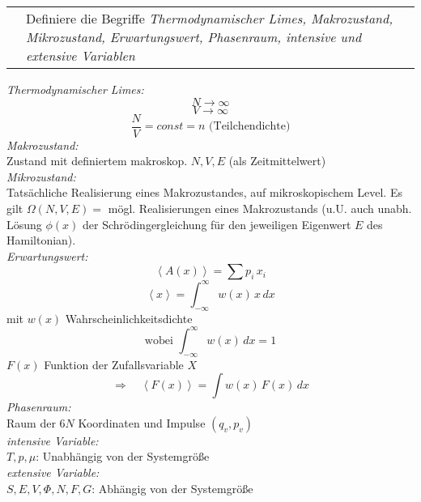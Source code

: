 \documentclass[a4paper,12pt]{scrartcl}
\makeatletter
\def\rsp{\right>}					%
\def\lsp{\left<}					%
\newcounter{qc}\setcounter{qc}{1}
\newenvironment{fshaded}{
\def\FrameCommand{\fcolorbox{framecolor}{shadecolor}}
\MakeFramed {\FrameRestore}}
{\endMakeFramed}
\def\frage#1{
\begin{fshaded}
\noindent
\begin{tabularx}{0.99\textwidth}{@{}c!{\color{framecolor}\vline}X}
{ \bf \rm \theqc }	&	\noindent #1
\end{tabularx}
\stepcounter{qc}
\end{fshaded}
}
\makeatother
\begin{document}
\frage{Definiere die Begriffe \textit{Thermodynamischer Limes, Makrozustand, Mikrozustand, Erwartungswert, Phasenraum, 
intensive und extensive Variablen}}
\noindent
\textit{Thermodynamischer Limes:}\\
\[N \rightarrow \infty\]
\[V \rightarrow \infty\]
\[\frac{N}{V}=const=n \mbox{ (Teilchendichte)}\]
\textit{Makrozustand:}\\Zustand mit definiertem makroskop. $N,V,E$ (als Zeitmittelwert)\\
\textit{Mikrozustand:}\\Tatsächliche Realisierung eines Makrozustandes, auf mikroskopischem Level. Es gilt $\Omega(N,V,E)=$ 
mögl. Realisierungen eines Makrozustands (u.U. auch unabh. Lösung $\phi(x)$ der Schrödingergleichung für den jeweiligen 
Eigenwert $E$ des Hamiltonian).\\
\textit{Erwartungswert:}
\[\lsp{A(x)}\rsp=\sum p_i\,x_i\]
\[\lsp{x}\rsp=\int_{-\infty}^{\infty} w(x)\,x\,dx\]
mit $w(x)$ Wahrscheinlichkeitsdichte
\[\mbox{wobei } \int_{-\infty}^{\infty}w(x)\,dx=1\]
$F(x)$ Funktion der Zufallsvariable $X$
\[\Rightarrow \quad\lsp{F(x)}\rsp=\int w(x)\,F(x)\,dx\]
\textit{Phasenraum:}\\Raum der $6N$ Koordinaten und Impulse $(q_v,p_v)$\\
\textit{intensive Variable:}\\
$T,p,\mu$: Unabhängig von der Systemgröße\\
\textit{extensive Variable:}\\
$S,E,V,\Phi,N,F,G$: Abhängig von der Systemgröße\\

\end{document}
